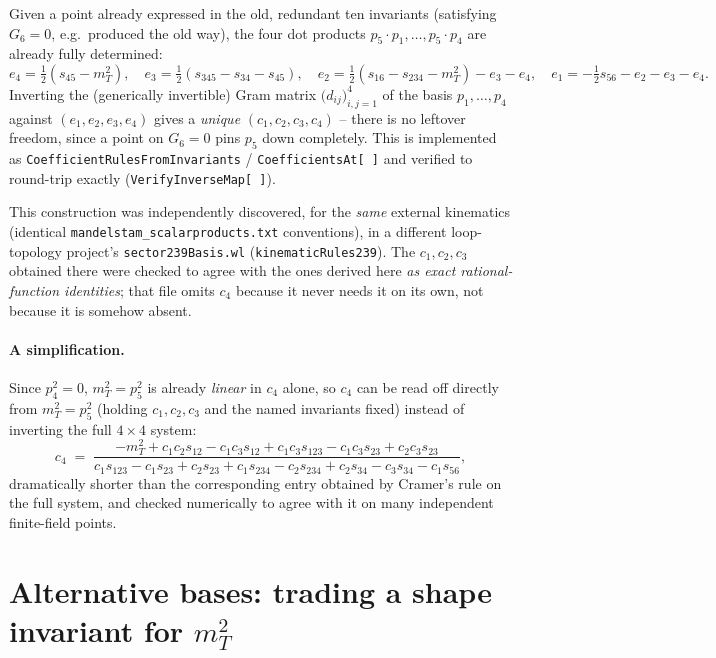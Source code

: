 \documentclass[11pt]{article}
\newcommand{\code}[1]{\texttt{#1}}
\begin{document}
Given a point already expressed in the old, redundant ten invariants (satisfying $G_6=0$, e.g.\ produced the old way), the four dot products $p_5\!\cdot\! p_1,\dots,p_5\!\cdot\! p_4$ are already fully determined:
\[
  e_4=\tfrac12(s_{45}-m_T^2),\quad
  e_3=\tfrac12(s_{345}-s_{34}-s_{45}),\quad
  e_2=\tfrac12(s_{16}-s_{234}-m_T^2)-e_3-e_4,\quad
  e_1=-\tfrac12 s_{56}-e_2-e_3-e_4.
\]
Inverting the (generically invertible) Gram matrix $\big(d_{ij}\big)_{i,j=1}^4$ of the basis $p_1,\dots,p_4$ against $(e_1,e_2,e_3,e_4)$ gives a \emph{unique} $(c_1,c_2,c_3,c_4)$ -- there is no leftover freedom, since a point on $G_6=0$ pins $p_5$ down completely. This is implemented as \code{CoefficientRulesFromInvariants} / \code{CoefficientsAt[\ ]} and verified to round-trip exactly (\code{VerifyInverseMap[\ ]}).

This construction was independently discovered, for the \emph{same} external kinematics (identical \code{mandelstam\_scalarproducts.txt} conventions), in a different loop-topology project's \code{sector239Basis.wl} (\texttt{kinematicRules239}). The $c_1,c_2,c_3$ obtained there were checked to agree with the ones derived here \emph{as exact rational-function identities}; that file omits $c_4$ because it never needs it on its own, not because it is somehow absent.

\paragraph{A simplification.} Since $p_4^2=0$, $m_T^2=p_5^2$ is already \emph{linear} in $c_4$ alone, so $c_4$ can be read off directly from $m_T^2=p_5^2$ (holding $c_1,c_2,c_3$ and the named invariants fixed) instead of inverting the full $4\times4$ system:
\[
  c_4 \;=\; \frac{-m_T^2 + c_1c_2 s_{12} - c_1c_3 s_{12} + c_1c_3 s_{123} - c_1c_3 s_{23} + c_2c_3 s_{23}}
  {c_1 s_{123} - c_1 s_{23} + c_2 s_{23} + c_1 s_{234} - c_2 s_{234} + c_2 s_{34} - c_3 s_{34} - c_1 s_{56}},
\]
dramatically shorter than the corresponding entry obtained by Cramer's rule on the full system, and checked numerically to agree with it on many independent finite-field points.

\section{Alternative bases: trading a shape invariant for $m_T^2$}
\end{document}
